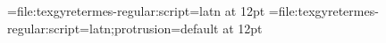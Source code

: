 

 

\font\testa=file:texgyretermes-regular:script=latn at 12pt
\font\testb=file:texgyretermes-regular:script=latn;protrusion=default at 12pt
\testa  \par
\testb  \par
\bye
